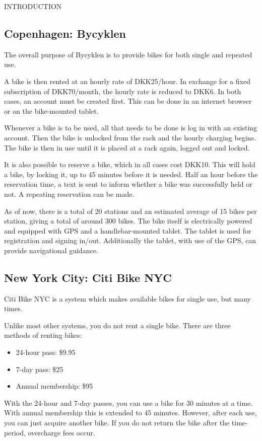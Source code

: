 INTRODUCTION

\subsection{Copenhagen: Bycyklen}
The overall purpose of Bycyklen\cite{cph_bycyklen} is to provide bikes for both single and repeated use.

A bike is then rented at an hourly rate of DKK25/hour.
In exchange for a fixed subscription of DKK70/month, the hourly rate is reduced to DKK6.
In both cases, an account must be created first.
This can be done in an internet browser or on the bike-mounted tablet.

Whenever a bike is to be used, all that needs to be done is log in with an existing account.
Then the bike is unlocked from the rack and the hourly charging begins.
The bike is then in use until it is placed at a rack again, logged out and locked.

It is also possible to reserve a bike, which in all cases cost DKK10.
This will hold a bike, by locking it, up to 45 minutes before it is needed.
Half an hour before the reservation time, a text is sent to inform whether a bike was successfully held or not.
A repeating reservation can be made.

As of now, there is a total of 20 stations and an estimated average of 15 bikes per station, giving a total of around 300 bikes.
The bike itself is electrically powered and equipped with GPS and a handlebar-mounted tablet.
The tablet is used for registration and signing in/out.
Additionally the tablet, with use of the GPS, can provide navigational guidance.

\subsection{New York City: Citi Bike NYC}
Citi Bike NYC\cite{nyc_citibike} is a system which makes available bikes for single use, but many times.

Unlike most other systems, you do not rent a single bike.
There are three methods of renting bikes:

\begin{itemize}
\item 24-hour pass: \$9.95
\item 7-day pass: \$25
\item Annual membership: \$95
\end{itemize}

With the 24-hour and 7-day passes, you can use a bike for 30 minutes at a time.
With annual membership this is extended to 45 minutes.
However, after each use, you can just acquire another bike.
If you do not return the bike after the time-period, overcharge fees occur.

